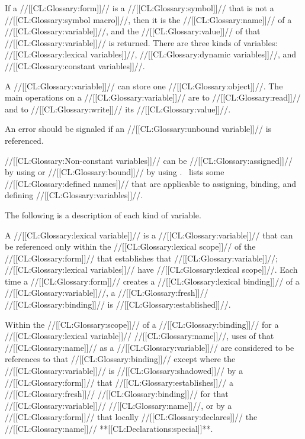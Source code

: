 If a //[[CL:Glossary:form]]// is a //[[CL:Glossary:symbol]]// that is not a //[[CL:Glossary:symbol macro]]//, then it is the //[[CL:Glossary:name]]// of a //[[CL:Glossary:variable]]//, and the //[[CL:Glossary:value]]// of that //[[CL:Glossary:variable]]// is returned. There are three kinds of variables:
 //[[CL:Glossary:lexical variables]]//,
 //[[CL:Glossary:dynamic variables]]//, and
 //[[CL:Glossary:constant variables]]//.

A //[[CL:Glossary:variable]]// can store one //[[CL:Glossary:object]]//. The main operations on a //[[CL:Glossary:variable]]// are 
 to //[[CL:Glossary:read]]// and 
 to //[[CL:Glossary:write]]// its //[[CL:Glossary:value]]//.

An error  should be signaled if an //[[CL:Glossary:unbound variable]]// is referenced.

//[[CL:Glossary:Non-constant variables]]// can be //[[CL:Glossary:assigned]]// by using   or //[[CL:Glossary:bound]]// by using . \Thenextfigure\ lists some //[[CL:Glossary:defined names]]// that are applicable to assigning, binding, and defining //[[CL:Glossary:variables]]//.


The following is a description of each kind of variable.


A //[[CL:Glossary:lexical variable]]// is a //[[CL:Glossary:variable]]// that can be referenced only within  the //[[CL:Glossary:lexical scope]]// of the //[[CL:Glossary:form]]// that establishes that //[[CL:Glossary:variable]]//; //[[CL:Glossary:lexical variables]]// have //[[CL:Glossary:lexical scope]]//. Each time a //[[CL:Glossary:form]]// creates a //[[CL:Glossary:lexical binding]]// of a //[[CL:Glossary:variable]]//, a //[[CL:Glossary:fresh]]// //[[CL:Glossary:binding]]// is //[[CL:Glossary:established]]//.

Within the //[[CL:Glossary:scope]]// of a //[[CL:Glossary:binding]]// for a //[[CL:Glossary:lexical variable]]// //[[CL:Glossary:name]]//, uses of that //[[CL:Glossary:name]]// as a //[[CL:Glossary:variable]]// are considered to be references to that //[[CL:Glossary:binding]]// except where the //[[CL:Glossary:variable]]// is //[[CL:Glossary:shadowed]]//  by a //[[CL:Glossary:form]]// that //[[CL:Glossary:establishes]]// a //[[CL:Glossary:fresh]]// //[[CL:Glossary:binding]]// for that  //[[CL:Glossary:variable]]// //[[CL:Glossary:name]]//, or by a //[[CL:Glossary:form]]// that locally //[[CL:Glossary:declares]]// the //[[CL:Glossary:name]]// **[[CL:Declarations:special]]**.

